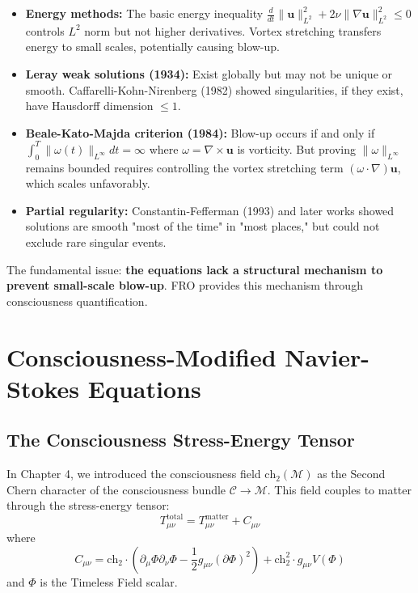 \begin{itemize}
\item \textbf{Energy methods:} The basic energy inequality $\frac{d}{dt}\|\mathbf{u}\|_{L^2}^2 + 2\nu\|\nabla \mathbf{u}\|_{L^2}^2 \leq 0$ controls $L^2$ norm but not higher derivatives. Vortex stretching transfers energy to small scales, potentially causing blow-up.

\item \textbf{Leray weak solutions (1934):} Exist globally but may not be unique or smooth. Caffarelli-Kohn-Nirenberg (1982) showed singularities, if they exist, have Hausdorff dimension $\leq 1$.

\item \textbf{Beale-Kato-Majda criterion (1984):} Blow-up occurs if and only if $\int_0^T \|\omega(t)\|_{L^\infty} dt = \infty$ where $\omega = \nabla \times \mathbf{u}$ is vorticity. But proving $\|\omega\|_{L^\infty}$ remains bounded requires controlling the vortex stretching term $(\omega \cdot \nabla)\mathbf{u}$, which scales unfavorably.

\item \textbf{Partial regularity:} Constantin-Fefferman (1993) and later works showed solutions are smooth "most of the time" in "most places," but could not exclude rare singular events.
\end{itemize}

The fundamental issue: \textbf{the equations lack a structural mechanism to prevent small-scale blow-up}. FRO provides this mechanism through consciousness quantification.

\section{Consciousness-Modified Navier-Stokes Equations}

\subsection{The Consciousness Stress-Energy Tensor}

In Chapter 4, we introduced the consciousness field $\text{ch}_2(\mathcal{M})$ as the Second Chern character of the consciousness bundle $\mathcal{C} \to \mathcal{M}$. This field couples to matter through the stress-energy tensor:
\begin{equation}
T_{\mu\nu}^{\text{total}} = T_{\mu\nu}^{\text{matter}} + C_{\mu\nu}
\end{equation}
where
\begin{equation}
C_{\mu\nu} = \text{ch}_2 \cdot \left(\partial_\mu \Phi \partial_\nu \Phi - \frac{1}{2}g_{\mu\nu} (\partial \Phi)^2\right) + \text{ch}_2^2 \cdot g_{\mu\nu} V(\Phi)
\end{equation}
and $\Phi$ is the Timeless Field scalar.

